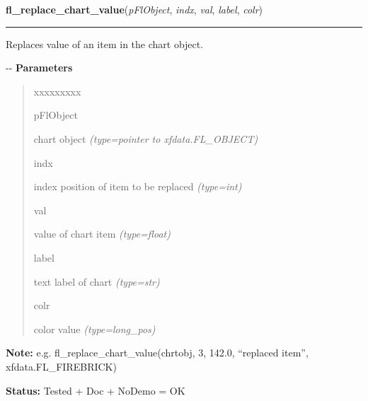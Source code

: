     \vspace{0.5ex}

\hspace{.8\funcindent}\begin{boxedminipage}{\funcwidth}

    \raggedright \textbf{fl\_replace\_chart\_value}(\textit{pFlObject}, \textit{indx}, \textit{val}, \textit{label}, \textit{colr})

    \vspace{-1.5ex}

    \rule{\textwidth}{0.5\fboxrule}
\setlength{\parskip}{2ex}

Replaces value of an item in the chart object.

-{}-
\setlength{\parskip}{1ex}
      \textbf{Parameters}
      \vspace{-1ex}

      \begin{quote}
        \begin{Ventry}{xxxxxxxxx}

          \item[pFlObject]


chart object
            {\it (type=pointer to xfdata.FL\_OBJECT)}

          \item[indx]


index position of item to be replaced
            {\it (type=int)}

          \item[val]


value of chart item
            {\it (type=float)}

          \item[label]


text label of chart
            {\it (type=str)}

          \item[colr]


color value
            {\it (type=long\_pos)}

        \end{Ventry}

      \end{quote}

\textbf{Note:} 
e.g. fl\_replace\_chart\_value(chrtobj, 3, 142.0, ``replaced item'',
xfdata.FL\_FIREBRICK)


\textbf{Status:} 
Tested + Doc + NoDemo = OK


    \end{boxedminipage}

